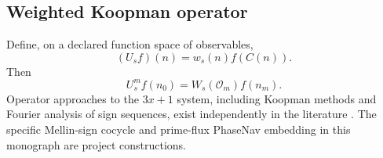 \subsection{Weighted Koopman operator}

Define, on a declared function space of observables,
\begin{equation}
\boxed{(U_s f)(n)=w_s(n)f(C(n)).}
\end{equation}
Then
\begin{equation}
U_s^m f(n_0)=W_s(\mathcal O_m)f(n_m).
\end{equation}
Operator approaches to the \(3x+1\) system, including Koopman methods and Fourier analysis of sign sequences, exist independently in the literature \cite{LeventidesPoulios2020}. The specific Mellin-sign cocycle and prime-flux PhaseNav embedding in this monograph are project constructions.
